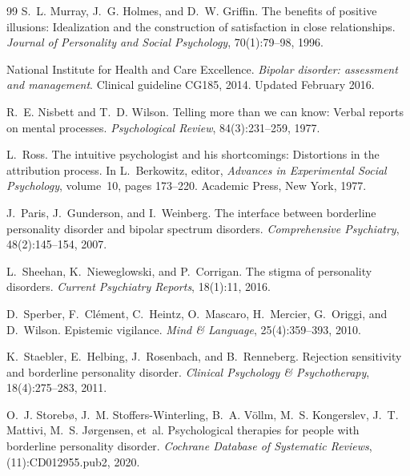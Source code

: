 \documentclass[11pt]{article}
\theoremstyle{definition}
\theoremstyle{remark}
\begin{document}
\begin{thebibliography}{99}
S.~L. Murray, J.~G. Holmes, and D.~W. Griffin.
\newblock The benefits of positive illusions: Idealization and the construction of satisfaction in close relationships.
\newblock \emph{Journal of Personality and Social Psychology}, 70(1):79--98, 1996.

National Institute for Health and Care Excellence.
\newblock \emph{Bipolar disorder: assessment and management}.
\newblock Clinical guideline CG185, 2014. Updated February 2016.

R.~E. Nisbett and T.~D. Wilson.
\newblock Telling more than we can know: Verbal reports on mental processes.
\newblock \emph{Psychological Review}, 84(3):231--259, 1977.

L.~Ross.
\newblock The intuitive psychologist and his shortcomings: Distortions in the attribution process.
\newblock In L.~Berkowitz, editor, \emph{Advances in Experimental Social Psychology}, volume~10, pages 173--220. Academic Press, New York, 1977.

J.~Paris, J.~Gunderson, and I.~Weinberg.
\newblock The interface between borderline personality disorder and bipolar spectrum disorders.
\newblock \emph{Comprehensive Psychiatry}, 48(2):145--154, 2007.

L.~Sheehan, K.~Nieweglowski, and P.~Corrigan.
\newblock The stigma of personality disorders.
\newblock \emph{Current Psychiatry Reports}, 18(1):11, 2016.

D.~Sperber, F.~Cl{\'e}ment, C.~Heintz, O.~Mascaro, H.~Mercier, G.~Origgi, and D.~Wilson.
\newblock Epistemic vigilance.
\newblock \emph{Mind \& Language}, 25(4):359--393, 2010.

K.~Staebler, E.~Helbing, J.~Rosenbach, and B.~Renneberg.
\newblock Rejection sensitivity and borderline personality disorder.
\newblock \emph{Clinical Psychology \& Psychotherapy}, 18(4):275--283, 2011.

O.~J. Storeb{\o}, J.~M. Stoffers-Winterling, B.~A. V{\"o}llm, M.~S. Kongerslev, J.~T. Mattivi, M.~S. J{\o}rgensen, et~al.
\newblock Psychological therapies for people with borderline personality disorder.
\newblock \emph{Cochrane Database of Systematic Reviews}, (11):CD012955.pub2, 2020.


\end{thebibliography}
\end{document}
